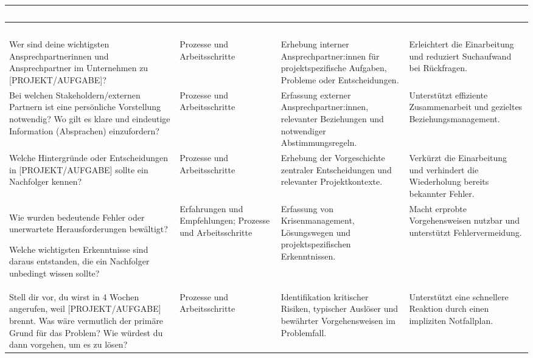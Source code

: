 \documentclass[
  10pt,
  ngerman,
  a4paper,
  toc=graduated,
  numbers=noenddot,
  headings=standardclasses,
  nonumberlist
]{scrartcl}
\begin{document}
\begin{longtable}{|L{4.9cm}|L{3.1cm}|L{3.8cm}|L{3.3cm}|}
\hline
{}
\textcolor{white}{\textbf{Frage}} &
\textcolor{white}{\textbf{Ergebniskategorie}} &
\textcolor{white}{\textbf{Erkenntnisinteresse}} &
\textcolor{white}{\textbf{Begründung}} \\
\hline
\endfirsthead

\hline
{}
\textcolor{white}{\textbf{Frage}} &
\textcolor{white}{\textbf{Ergebniskategorie}} &
\textcolor{white}{\textbf{Erkenntnisinteresse}} &
\textcolor{white}{\textbf{Begründung}} \\
\hline
\endhead

Wer sind deine wichtigsten Ansprechpartnerinnen und Ansprechpartner im Unternehmen zu [PROJEKT/AUFGABE]?
& Prozesse und Arbeitsschritte
& Erhebung interner Ansprechpartner:innen für projektspezifische Aufgaben, Probleme oder Entscheidungen.
& Erleichtert die Einarbeitung und reduziert Suchaufwand bei Rückfragen. \\
\hline

Bei welchen Stakeholdern/externen Partnern ist eine persönliche Vorstellung notwendig? Wo gilt es klare und eindeutige Information (Absprachen) einzufordern?
& Prozesse und Arbeitsschritte
& Erfassung externer Ansprechpartner:innen, relevanter Beziehungen und notwendiger Abstimmungsregeln.
& Unterstützt effiziente Zusammenarbeit und gezieltes Beziehungsmanagement. \\
\hline

Welche Hintergründe oder Entscheidungen in [PROJEKT/AUFGABE] sollte ein Nachfolger kennen?
& Prozesse und Arbeitsschritte
& Erhebung der Vorgeschichte zentraler Entscheidungen und relevanter Projektkontexte.
& Verkürzt die Einarbeitung und verhindert die Wiederholung bereits bekannter Fehler. \\
\hline

Wie wurden bedeutende Fehler oder unerwartete Herausforderungen bewältigt? 

Welche wichtigsten Erkenntnisse sind daraus entstanden, die ein Nachfolger unbedingt wissen sollte?
& Erfahrungen und Empfehlungen; Prozesse und Arbeitsschritte
& Erfassung von Krisenmanagement, Lösungswegen und projektspezifischen Erkenntnissen.
& Macht erprobte Vorgehensweisen nutzbar und unterstützt Fehlervermeidung. \\
\hline

Stell dir vor, du wirst in 4 Wochen angerufen, weil [PROJEKT/AUFGABE] brennt. Was wäre vermutlich der primäre Grund für das Problem? Wie würdest du dann vorgehen, um es zu lösen?
& Prozesse und Arbeitsschritte
& Identifikation kritischer Risiken, typischer Auslöser und bewährter Vorgehensweisen im Problemfall.
& Unterstützt eine schnellere Reaktion durch einen impliziten Notfallplan. \\
\hline


\end{longtable}
\end{document}
